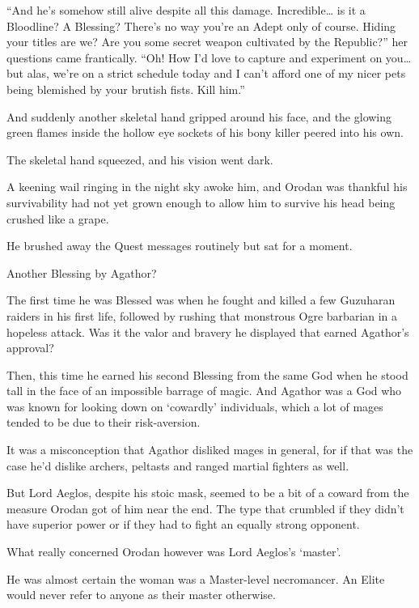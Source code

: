 \documentclass[a4paper,10pt]{book}
\begin{document}
“And he’s somehow still alive despite all this damage. Incredible… is it a Bloodline? A Blessing? There’s no way you’re an Adept only of course. Hiding your titles are we? Are you some secret weapon cultivated by the Republic?” her questions came frantically. “Oh! How I’d love to capture and experiment on you… but alas, we’re on a strict schedule today and I can’t afford one of my nicer pets being blemished by your brutish fists. Kill him.”\par
And suddenly another skeletal hand gripped around his face, and the glowing green flames inside the hollow eye sockets of his bony killer peered into his own.\par
The skeletal hand squeezed, and his vision went dark.\par
\par
A keening wail ringing in the night sky awoke him, and Orodan was thankful his survivability had not yet grown enough to allow him to survive his head being crushed like a grape.\par
He brushed away the Quest messages routinely but sat for a moment.\par
Another Blessing by Agathor?\par
The first time he was Blessed was when he fought and killed a few Guzuharan raiders in his first life, followed by rushing that monstrous Ogre barbarian in a hopeless attack. Was it the valor and bravery he displayed that earned Agathor’s approval?\par
Then, this time he earned his second Blessing from the same God when he stood tall in the face of an impossible barrage of magic. And Agathor was a God who was known for looking down on ‘cowardly’ individuals, which a lot of mages tended to be due to their risk-aversion.\par
It was a misconception that Agathor disliked mages in general, for if that was the case he’d dislike archers, peltasts and ranged martial fighters as well.\par
But Lord Aeglos, despite his stoic mask, seemed to be a bit of a coward from the measure Orodan got of him near the end. The type that crumbled if they didn’t have superior power or if they had to fight an equally strong opponent.\par
What really concerned Orodan however was Lord Aeglos’s ‘master’.\par
He was almost certain the woman was a Master-level necromancer. An Elite would never refer to anyone as their master otherwise.\par
\end{document}

